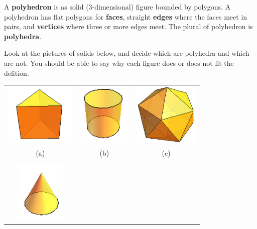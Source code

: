 \bigskip

\begin{define}
A {\bf polyhedron} is as solid (3-dimensional) figure bounded by polygons.    A polyhedron has flat polygons for {\bf faces}, straight {\bf edges} where the faces meet in pairs, and {\bf vertices} where three or more edges meet.  The plural of polyhedron is {\bf polyhedra}.
\end{define}

\bigskip

\begin{thinkpair*}
Look at the pictures of solids below, and decide which are polyhedra and which are not.  You should be able to say why each figure does or does not fit the defition.
\end{thinkpair*}

\begin{center}
\begin{tabular}{ccc}
\quad
\includegraphics[height=3cm]{triprism}
\quad
&
\quad
\includegraphics[height=3cm]{cylinder}
\quad
&
\quad
\includegraphics[height=3cm]{icosahedron}
\quad\\
(a) & (b) & (c)\\
\\
\quad
\includegraphics[height=3cm]{cone}

\end{tabular}
\end{center}

